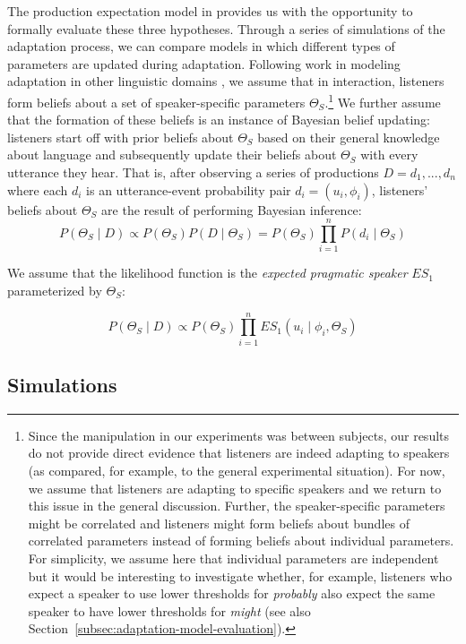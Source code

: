 The production expectation model in  provides us with the opportunity to formally evaluate these three hypotheses.
Through a series of simulations of the adaptation process, we can compare models in which different types of parameters are
 updated during adaptation. Following work in modeling adaptation in other linguistic domains \cite[e.g.,][]{Kleinschmidt2012,Kleinschmidt2015,Qing2014,Hawkins2017,Roettger2019}, 
we assume that in interaction, listeners form beliefs about a set of speaker-specific parameters $\Theta_S$.\footnote{Since the manipulation in our experiments was between subjects, our results do not provide direct evidence that listeners are indeed adapting to speakers (as compared, for example, to the general experimental situation). For now, we assume that listeners are adapting to specific speakers and we return to this issue in the general discussion.
Further, the speaker-specific parameters might be correlated and  listeners might form beliefs about bundles of correlated parameters instead of forming beliefs about individual parameters. For simplicity, we assume here that individual parameters are independent but it would be interesting to investigate whether, for example, listeners who expect a speaker to use lower thresholds for \textit{probably} also expect the same speaker to have lower thresholds for \textit{might} (see also Section~\ref{subsec:adaptation-model-evaluation}).}
We further assume that the formation of these beliefs is an instance of Bayesian belief updating:
listeners start off with prior beliefs about $\Theta_S$ based on their general knowledge about 
language and subsequently update their beliefs about $\Theta_S$ with every utterance they hear. 
That is, after observing a series of productions $D={d_1, ..., d_n}$ where each $d_i$ is an 
utterance-event probability pair $d_i = (u_i, \phi_i)$, listeners' beliefs about $\Theta_S$ are the result
of performing Bayesian inference:
$$P(\Theta_S \mid D) \propto P(\Theta_S) P(D \mid \Theta_S) = P(\Theta_S) \prod_{i=1}^nP(d_i \mid \Theta_S) $$

\noindent We assume that the likelihood function is the \textit{expected pragmatic speaker} $ES_1$ parameterized by $\Theta_S$:

$$P(\Theta_S \mid D) \propto P(\Theta_S)  \prod_{i=1}^n ES_1(u_i \mid \phi_i, \Theta_S) $$



\subsection{Simulations}

